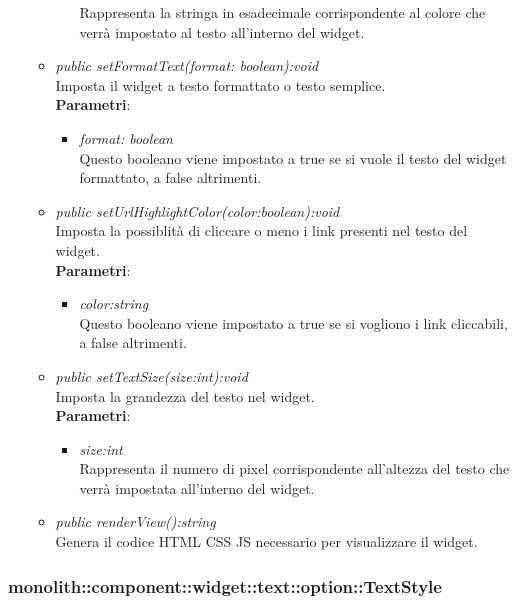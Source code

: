 \begin{itemize}
\begin{itemize}
\begin{itemize}
		Rappresenta la stringa in esadecimale corrispondente al colore che verrà impostato al testo all'interno del widget.
		\end{itemize} 
	\item \textit{public setFormatText(format: boolean):void}\\
	Imposta il widget a testo formattato o testo semplice.
		\\ \textbf{Parametri}: \begin{itemize}
		\item \textit{format: boolean}\\
		Questo booleano viene impostato a true se si vuole il testo del widget formattato, a false altrimenti.
		\end{itemize} 
	\item \textit{public setUrlHighlightColor(color:boolean):void}\\
	Imposta la possiblità di cliccare o meno i link presenti nel testo del widget.
		\\ \textbf{Parametri}: \begin{itemize}
		\item \textit{color:string}\\
		Questo booleano viene impostato a true se si vogliono i link cliccabili, a false altrimenti.
		\end{itemize} 
	\item \textit{public setTextSize(size:int):void}\\
	Imposta la grandezza del testo nel widget.
		\\ \textbf{Parametri}: \begin{itemize}
		\item \textit{size:int}\\
		Rappresenta il numero di pixel corrispondente all'altezza del testo che verrà impostata all'interno del widget.
		\end{itemize} 
	\item \textit{public renderView():string}\\
	Genera il codice HTML CSS JS necessario per visualizzare il widget.
	\end{itemize}
\end{itemize}

\subsubsection{monolith::component::widget::text::option::TextStyle}

